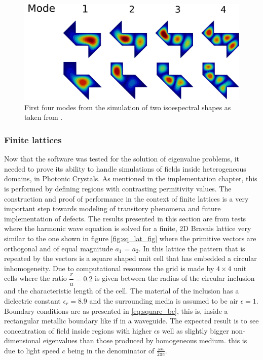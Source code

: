 \begin{figure}
\centering
\includegraphics[scale=0.15]{./img/isoespectral.pdf}
\caption{First four modes from the simulation of two isoespectral shapes as taken from \cite{Chapman1995}.}
\label{fig:isoespectral_waveguide}
\end{figure}

\subsubsection{Finite lattices}

Now that the software was tested for the solution of eigenvalue problems, it needed to prove its ability to handle simulations of fields inside heterogeneous domains,  in Photonic Crystals. As mentioned in the implementation chapter, this is performed by defining regions with contrasting permitivity values. The construction and proof of performance in the context of finite lattices is a very important step towards modeling of transitory phenomena and future implementation of defects. 
The results presented in this section are from tests where the harmonic wave equation is solved for a finite, 2D Bravais lattice very similar to the one shown in figure \ref{fig:sq_lat_fig} where the primitive vectors are orthogonal and of equal magnitude $a_1$ = $a_2$. In this lattice the pattern that is repeated by the vectors is a square shaped unit cell that has embedded a circular inhomogeneity. 
Due to computational resources the grid is made by $4\times 4$ unit cells where the ratio $\dfrac{r}{a}=0.2$ is given between the radius of the circular inclusion and the characteristic length of the cell. The material of the inclusion has a dielectric constant $\epsilon_r = 8.9$ and the surrounding media is assumed to be air $\epsilon =1$. Boundary conditions are as presented in  \ref{eq:square_bc}, this is, inside a rectangular metallic boundary like if in a wave\remove[SEC]{-}guide. The expected result is to see concentration of field inside regions with higher $\epsilon$s well as slightly bigger non-dimensional eigenvalues than those produced by homogeneous medium. this is due to light speed $c$ being in the denominator of $\frac{\omega
a}{2\pi c}$. 

